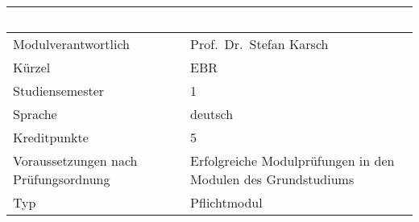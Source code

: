 \begin{longtable}[]{@{}ll@{}}
\toprule
\begin{minipage}[b]{0.12\columnwidth}\raggedright\strut
~\strut
\end{minipage} & \begin{minipage}[b]{0.12\columnwidth}\raggedright\strut
~\strut
\end{minipage}\tabularnewline
\midrule
\endhead
\begin{minipage}[t]{0.12\columnwidth}\raggedright\strut
Modulverantwortlich\strut
\end{minipage} & \begin{minipage}[t]{0.12\columnwidth}\raggedright\strut
Prof.~Dr.~Stefan Karsch\strut
\end{minipage}\tabularnewline
\begin{minipage}[t]{0.12\columnwidth}\raggedright\strut
Kürzel\strut
\end{minipage} & \begin{minipage}[t]{0.12\columnwidth}\raggedright\strut
EBR\strut
\end{minipage}\tabularnewline
\begin{minipage}[t]{0.12\columnwidth}\raggedright\strut
Studiensemester\strut
\end{minipage} & \begin{minipage}[t]{0.12\columnwidth}\raggedright\strut
1\strut
\end{minipage}\tabularnewline
\begin{minipage}[t]{0.12\columnwidth}\raggedright\strut
Sprache\strut
\end{minipage} & \begin{minipage}[t]{0.12\columnwidth}\raggedright\strut
deutsch\strut
\end{minipage}\tabularnewline
\begin{minipage}[t]{0.12\columnwidth}\raggedright\strut
Kreditpunkte\strut
\end{minipage} & \begin{minipage}[t]{0.12\columnwidth}\raggedright\strut
5\strut
\end{minipage}\tabularnewline
\begin{minipage}[t]{0.12\columnwidth}\raggedright\strut
Voraussetzungen nach Prüfungsordnung\strut
\end{minipage} & \begin{minipage}[t]{0.12\columnwidth}\raggedright\strut
Erfolgreiche Modulprüfungen in den Modulen des Grundstudiums\strut
\end{minipage}\tabularnewline
\begin{minipage}[t]{0.12\columnwidth}\raggedright\strut
Typ\strut
\end{minipage} & \begin{minipage}[t]{0.12\columnwidth}\raggedright\strut
Pflichtmodul\strut
\end{minipage}\tabularnewline
\bottomrule
\end{longtable}


